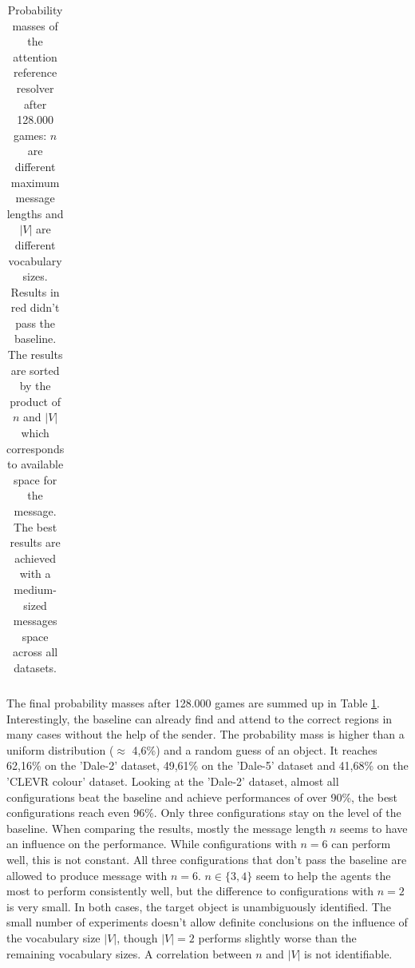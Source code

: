 \documentclass[11pt]{article}
\begin{document}
\begin{table}[ht]
\begin{tabular}{cc|c|c|c}
                \bottomrule
        \end{tabular}
        \caption{Probability masses of the attention reference resolver after 128.000 games: $n$ are different maximum message lengths and $|V|$ are different vocabulary sizes. Results in red didn't pass the baseline. The results are sorted by the product of $n$ and $|V|$ which corresponds to available space for the message. The best results are achieved with a medium-sized messages space across all datasets.}
        \label{tab:results:attention-reference-resolver-game}
\end{table}


The final probability masses after 128.000 games are summed up in Table \ref{tab:results:attention-reference-resolver-game}.
Interestingly, the baseline can already find and attend to the correct regions in many cases without the help of the sender.
The probability mass is higher than a uniform distribution ($\approx$ 4,6\%) and a random guess of an object.
It reaches 62,16\% on the 'Dale-2' dataset, 49,61\% on the 'Dale-5' dataset and 41,68\% on the 'CLEVR colour' dataset.
Looking at the 'Dale-2' dataset, almost all configurations beat the baseline and achieve performances of over 90\%, the best configurations reach even 96\%.
Only three configurations stay on the level of the baseline. %
When comparing the results, mostly the message length $n$ seems to have an influence on the performance.
While configurations with $n=6$ can perform well, this is not constant.
All three configurations that don't pass the baseline are allowed to produce message with $n=6$.
$n \in \{3,4\}$ seem to help the agents the most to perform consistently well, but the difference to configurations with $n=2$ is very small.
In both cases, the target object is unambiguously identified.
The small number of experiments doesn't allow definite conclusions on the influence of the vocabulary size $|V|$, though $|V|=2$ performs slightly worse than the remaining vocabulary sizes.
A correlation between $n$ and $|V|$ is not identifiable.
\end{document}

